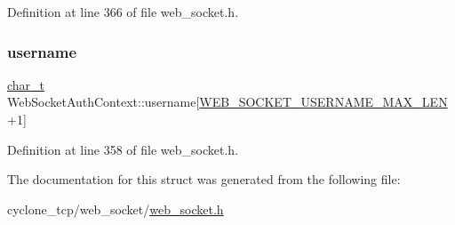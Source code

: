 Definition at line 366 of file web\+\_\+socket.\+h.

\mbox{\label{structWebSocketAuthContext_a69b8df5c2bf4a6849bec5f2c84068da9}} 
\subsubsection{\texorpdfstring{username}{username}}
{\footnotesize\ttfamily \hyperlink{compiler__port_8h_a40bb5262bf908c328fbcfbe5d29d0201}{char\+\_\+t} Web\+Socket\+Auth\+Context\+::username\mbox{[}\hyperlink{web__socket_8h_a60c61570c0a031b8e8108cb162a098e5}{W\+E\+B\+\_\+\+S\+O\+C\+K\+E\+T\+\_\+\+U\+S\+E\+R\+N\+A\+M\+E\+\_\+\+M\+A\+X\+\_\+\+L\+EN}+1\mbox{]}}



Definition at line 358 of file web\+\_\+socket.\+h.



The documentation for this struct was generated from the following file\+:\begin{DoxyCompactItemize}
\item 
cyclone\+\_\+tcp/web\+\_\+socket/\hyperlink{web__socket_8h}{web\+\_\+socket.\+h}\end{DoxyCompactItemize}
